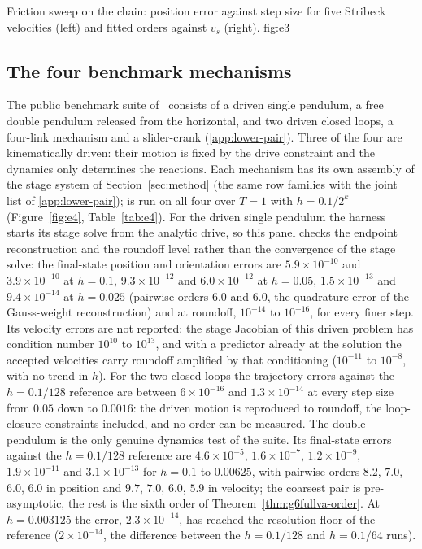 {Friction sweep on the chain: position error against step size for five Stribeck velocities (left)
and fitted orders against $v_s$ (right).}
{fig:e3}

\subsection{The four benchmark mechanisms}
\label{sec:e4}

The public benchmark suite of~\cite{kissel2022absolute} consists of a driven single pendulum, a
free double pendulum released from the horizontal, and two driven closed loops, a four-link
mechanism and a slider-crank (\ref{app:lower-pair}). Three of the four are kinematically
driven: their motion is fixed by the drive constraint and the dynamics only determines the
reactions. Each mechanism has its own assembly of the stage system of Section~\ref{sec:method} (the same
row families with the joint list of \ref{app:lower-pair}); \method{} is run on all four over
$T=1$ with $h=0.1/2^k$ (Figure~\ref{fig:e4}, Table~\ref{tab:e4}). For the driven
single pendulum the harness starts its stage solve from the analytic drive, so this panel checks
the endpoint reconstruction and the roundoff level rather than the convergence of the stage solve:
the final-state position and orientation errors are $5.9\times10^{-10}$ and $3.9\times10^{-10}$ at
$h=0.1$, $9.3\times10^{-12}$ and $6.0\times10^{-12}$ at $h=0.05$, $1.5\times10^{-13}$ and
$9.4\times10^{-14}$ at $h=0.025$ (pairwise orders $6.0$ and $6.0$, the quadrature error of the
Gauss-weight reconstruction) and at roundoff, $10^{-14}$ to $10^{-16}$, for every finer step. Its
velocity errors are not reported: the stage Jacobian of this driven problem has condition number
$10^{10}$ to $10^{13}$, and with a predictor already at the solution the accepted velocities carry
roundoff amplified by that conditioning ($10^{-11}$ to $10^{-8}$, with no trend in $h$). For the two closed loops the trajectory errors against the
$h=0.1/128$ reference are between $6\times10^{-16}$ and $1.3\times10^{-14}$ at every step size
from $0.05$ down to $0.0016$: the driven motion is reproduced to roundoff, the loop-closure
constraints included, and no order can be measured. The double pendulum is the only genuine
dynamics test of the suite. Its final-state errors against the $h=0.1/128$ reference are
$4.6\times10^{-5}$, $1.6\times10^{-7}$, $1.2\times10^{-9}$, $1.9\times10^{-11}$ and
$3.1\times10^{-13}$ for $h=0.1$ to $0.00625$, with pairwise orders $8.2$, $7.0$, $6.0$, $6.0$ in
position and $9.7$, $7.0$, $6.0$, $5.9$ in velocity; the coarsest pair is pre-asymptotic, the rest
is the sixth order of Theorem~\ref{thm:g6fullva-order}. At $h=0.003125$ the error,
$2.3\times10^{-14}$, has reached the resolution floor of the reference ($2\times10^{-14}$,
the difference between the $h=0.1/128$ and $h=0.1/64$ runs).

